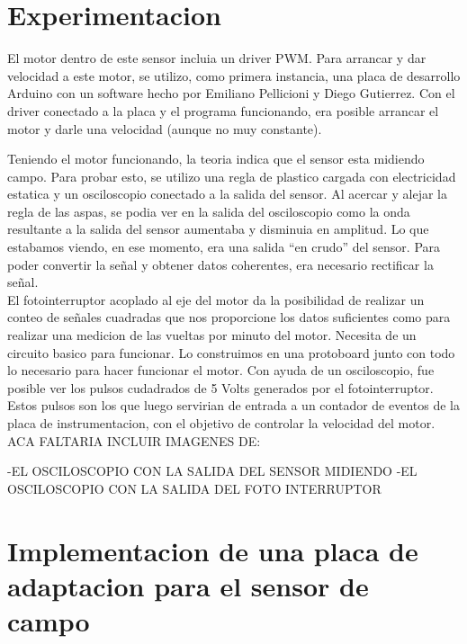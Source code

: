 
\section{Experimentacion} %
\label{sec:experimentacion}

El motor dentro de este sensor incluia un driver PWM. Para arrancar y dar velocidad a este motor, se utilizo, como primera instancia, una placa de desarrollo Arduino con un software hecho por Emiliano Pellicioni y Diego Gutierrez. Con el driver conectado a la placa y el programa funcionando, era posible arrancar el motor y darle una velocidad (aunque no muy constante).

Teniendo el motor funcionando, la teoria indica que el sensor esta midiendo campo. Para probar esto, se utilizo una regla de plastico cargada con electricidad estatica y un osciloscopio conectado a la salida del sensor. Al acercar y alejar la regla de las aspas, se podia ver en la salida del osciloscopio como la onda resultante a la salida del sensor aumentaba y disminuia en amplitud. Lo que estabamos viendo, en ese momento, era una salida ``en crudo'' del sensor. Para poder convertir la señal y obtener datos coherentes, era necesario rectificar la señal. \\

El fotointerruptor acoplado al eje del motor da la posibilidad de realizar un conteo de señales cuadradas que nos proporcione los datos suficientes como para realizar una medicion de las vueltas por minuto del motor. Necesita de un circuito basico para funcionar. Lo construimos en una protoboard junto con todo lo necesario para hacer funcionar el motor. Con ayuda de un osciloscopio, fue posible ver los pulsos cudadrados de 5 Volts generados por el fotointerruptor. Estos pulsos son los que luego servirian de entrada a un contador de eventos de la placa de instrumentacion, con el objetivo de controlar la velocidad del motor. \\

ACA FALTARIA INCLUIR IMAGENES DE:

-EL OSCILOSCOPIO CON LA SALIDA DEL SENSOR MIDIENDO
-EL OSCILOSCOPIO CON LA SALIDA DEL FOTO INTERRUPTOR


\section{Implementacion de una placa de adaptacion para el sensor de campo} %
\label{sec:implementacion_de_una_placa_de_adaptacion_para_el_sensor_de_campo}

